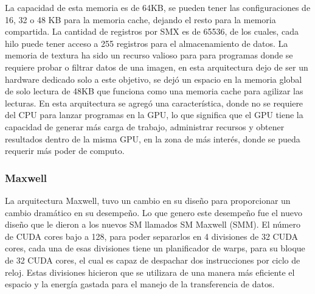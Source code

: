 La capacidad de esta memoria es de 64KB, se pueden tener las configuraciones de 16, 32 o 48 KB para la memoria cache, dejando el resto para la memoria compartida. La cantidad de registros por SMX es de 65536, de los cuales, cada hilo puede tener acceso a 255 registros para el almacenamiento de datos. La memoria de textura ha sido un recurso valioso para para programas donde se requiere probar o filtrar datos de una imagen, en esta arquitectura dejo de ser un hardware dedicado solo a este objetivo, se dejó un espacio en la memoria global de solo lectura de 48KB que funciona como una memoria cache para agilizar las lecturas.
En esta arquitectura se agregó una característica, donde no se requiere del CPU para lanzar programas en la GPU, lo que significa que el GPU tiene la capacidad de generar más carga de trabajo, administrar recursos y obtener resultados dentro de la misma GPU, en la zona de más interés, donde se pueda requerir más poder de computo. 
\pagebreak
\subsubsection{Maxwell}
La arquitectura Maxwell\cite{Maxwell}, tuvo un cambio en su diseño para proporcionar un cambio dramático en su desempeño. Lo que genero este desempeño fue el nuevo diseño que le dieron a los nuevos SM llamados SM Maxwell (SMM). El número de CUDA cores bajo a 128, para poder separarlos en 4 divisiones de 32 CUDA cores, cada una de esas divisiones tiene un planificador de warps, para su bloque de 32 CUDA cores, el cual es capaz de despachar dos instrucciones por ciclo de reloj. Estas divisiones hicieron que se utilizara de una manera más eficiente el espacio y la energía gastada para el manejo de la transferencia de datos.


